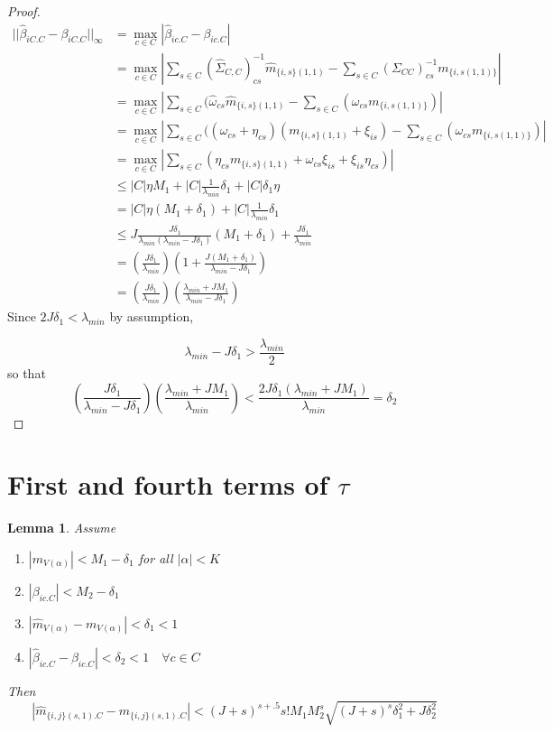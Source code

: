 \documentclass[]{article}
\newtheorem{lemma}{Lemma}
\begin{document}
\begin{proof}
\begin{equation}
\begin{aligned}
|| \hat \beta_{iC.C} - \beta_{iC.C} ||_\infty &= \max_{c \in C} |\hat \beta_{ic.C} - \beta_{ic.C}|\\
& = \max_{c \in C} |\sum_{s \in C}(\hat \Sigma_{C,C})^{-1}_{cs}\hat m_{\{i,s\}(1,1)} - \sum_{s\in C}(\Sigma_{CC})^{-1}_{cs}m_{\{i,s(1,1)\}}|
\\
& = \max_{c \in C} |\sum_{s \in C}(\hat\omega_{cs}\hat m_{\{i,s\}(1,1)} - \sum_{s\in C}( \omega_{cs}m_{\{i,s(1,1)\}})|
\\
& = \max_{c \in C} |\sum_{s \in C}((\omega_{cs} + \eta_{cs})( m_{\{i,s\}(1,1)} + \xi_{is}) - \sum_{s\in C}(\omega_{cs}m_{\{i,s(1,1)\}})|
\\
& = \max_{c \in C} |\sum_{s \in C}(\eta_{cs}m_{\{i,s\}(1,1)} +\omega_{cs}\xi_{is} + \xi_{is}\eta_{cs})|
\\
& \leq |C| \eta M_1 +|C| \frac{1}{\lambda_{min}}\delta_1 + |C|\delta_1 \eta
\\
& = |C| \eta (M_1  +  \delta_1) +|C| \frac{1}{\lambda_{min}}\delta_1
\\
& \leq J \frac{J\delta_1}{\lambda_{min}(\lambda_{min} - J\delta_1)} (M_1 + \delta_1) + \frac{J \delta_1}{\lambda_{min}} \\
& = \left(\frac{J \delta_1}{\lambda_{min}} \right)\left(1 + \frac{J(M_1 + \delta_1)}{\lambda_{min} - J\delta_1}\right)\\
& = \left(\frac{J \delta_1}{\lambda_{min}} \right)\left( \frac{\lambda_{min} + J M_1}{\lambda_{min} - J\delta_1}\right)
\end{aligned}
\end{equation}
Since $2J\delta_1 < \lambda_{min}$ by assumption,

\[\lambda_{min} - J\delta_1 > \frac{\lambda_{min}}{2}\]
so that
\begin{equation}
\left(\frac{J \delta_1}{\lambda_{min} - J\delta_1} \right)\left( \frac{\lambda_{min} + J M_1}{\lambda_{min}}\right) < \frac{2J \delta_1 \left( \lambda_{min} + J M_1\right)}{\lambda_{min}} = \delta_2
\end{equation}
\end{proof}

\section{First and fourth terms of $\tau$}

\begin{lemma}
Assume
\begin{enumerate}
\item $|m_{V(\alpha)}| < M_1 - \delta_1 $ for all $|\alpha| < K$
\item  $|\beta_{ic.C}| < M_2 - \delta_1 $
\item $|\hat m_{V(\alpha)} - m_{V(\alpha)}| < \delta_1 < 1$
\item$|\hat \beta_{ic.C} - \beta_{ic.C}| < \delta_2 < 1 \quad \forall c \in C$
\end{enumerate}

Then
\[|\hat m_{\{i,j\}(s,1).C} - m_{\{i,j\}(s,1).C}|  < (J+s)^{s + .5}s!M_1M_2^s \sqrt{(J+s)^s\delta_1^2 + J \delta_2^2}\]
\end{lemma}
\end{document}
